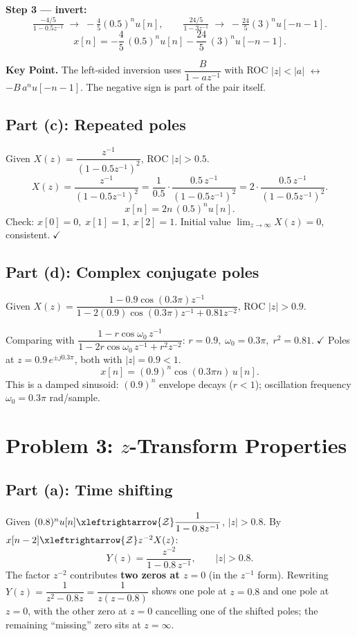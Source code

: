\documentclass[11pt]{article}
\newcommand{\zt}{\xleftrightarrow{\mathcal{Z}}}
\begin{document}
\textbf{Step 3 --- invert:}
\[
\tfrac{-4/5}{1-0.5z^{-1}}\;\longrightarrow\; -\tfrac{4}{5}(0.5)^{n}u[n],\qquad
\tfrac{24/5}{1-3z^{-1}}\;\longrightarrow\; -\tfrac{24}{5}(3)^{n}u[-n-1].
\]
\begin{equation*}
\boxed{x[n]=-\dfrac{4}{5}\,(0.5)^{n}u[n]-\dfrac{24}{5}\,(3)^{n}u[-n-1].}
\end{equation*}

\noindent\textbf{Key Point.} The left-sided inversion uses $\dfrac{B}{1-az^{-1}}$ with ROC $|z|<|a|$ $\longleftrightarrow$ $-B\,a^{n}u[-n-1]$. The negative sign is part of the pair itself.

\subsection*{Part (c): Repeated poles}
Given $X(z)=\dfrac{z^{-1}}{(1-0.5z^{-1})^{2}}$, ROC $|z|>0.5$.
\[
X(z)=\frac{z^{-1}}{(1-0.5z^{-1})^{2}}=\frac{1}{0.5}\cdot\frac{0.5\,z^{-1}}{(1-0.5z^{-1})^{2}}=2\cdot\frac{0.5\,z^{-1}}{(1-0.5z^{-1})^{2}}.
\]
\begin{equation*}
\boxed{x[n]=2n\,(0.5)^{n}u[n].}
\end{equation*}
Check: $x[0]=0,\; x[1]=1,\; x[2]=1$. Initial value $\lim_{z\to\infty}X(z)=0$, consistent.$\;\checkmark$

\subsection*{Part (d): Complex conjugate poles}
Given $X(z)=\dfrac{1-0.9\cos(0.3\pi)z^{-1}}{1-2(0.9)\cos(0.3\pi)z^{-1}+0.81z^{-2}}$, ROC $|z|>0.9$.

Comparing with $\dfrac{1-r\cos\omega_0\,z^{-1}}{1-2r\cos\omega_0\,z^{-1}+r^{2}z^{-2}}$: $r=0.9,\;\omega_0=0.3\pi,\;r^{2}=0.81.\;\checkmark$ Poles at $z=0.9\,e^{\pm j0.3\pi}$, both with $|z|=0.9<1$.
\begin{equation*}
\boxed{x[n]=(0.9)^{n}\cos(0.3\pi n)\,u[n].}
\end{equation*}
This is a damped sinusoid: $(0.9)^{n}$ envelope decays ($r<1$); oscillation frequency $\omega_0=0.3\pi$ rad/sample.

\section*{Problem 3: $z$-Transform Properties}

\subsection*{Part (a): Time shifting}
Given $(0.8)^{n}u[n]\zt\dfrac{1}{1-0.8z^{-1}}$, $|z|>0.8$. By $x[n-2]\zt z^{-2}X(z)$:
\begin{equation*}
\boxed{Y(z)=\dfrac{z^{-2}}{1-0.8\,z^{-1}}, \qquad |z|>0.8.}
\end{equation*}
The factor $z^{-2}$ contributes \textbf{two zeros at $z=0$} (in the $z^{-1}$ form). Rewriting $Y(z)=\dfrac{1}{z^{2}-0.8z}=\dfrac{1}{z(z-0.8)}$ shows one pole at $z=0.8$ and one pole at $z=0$, with the other zero at $z=0$ cancelling one of the shifted poles; the remaining ``missing'' zero sits at $z=\infty$.
\end{document}
